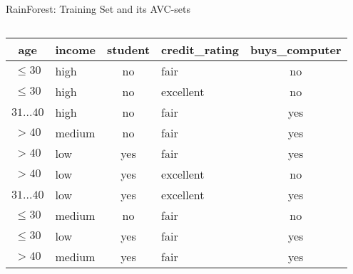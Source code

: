 \begin{frame}{RainForest: Training Set and its AVC-sets}
	\begin{columns}
		\begin{column}{0.6\textwidth}
			\begin{tabular}{|c|l|c|l|c|}
				\hline
				\cellcolor{blue!20}age            & \cellcolor{blue!20}income   & \cellcolor{blue!20}student & \cellcolor{blue!20}credit\_rating & \cellcolor{brown!20}buys\_computer \\\hline
				\cellcolor{yellow!20}$\leq30$     & \cellcolor{yellow!20}high   & \cellcolor{yellow!20}no    & \cellcolor{yellow!20}fair         & \cellcolor{red!20}no               \\\hline
				\cellcolor{yellow!20}$\leq30$     & \cellcolor{yellow!20}high   & \cellcolor{yellow!20}no    & \cellcolor{yellow!20}excellent    & \cellcolor{red!20}no               \\\hline
				\cellcolor{yellow!20}$31\ldots40$ & \cellcolor{yellow!20}high   & \cellcolor{yellow!20}no    & \cellcolor{yellow!20}fair         & \cellcolor{green!20}yes            \\\hline
				\cellcolor{yellow!20}$>40$        & \cellcolor{yellow!20}medium & \cellcolor{yellow!20}no    & \cellcolor{yellow!20}fair         & \cellcolor{green!20}yes            \\\hline
				\cellcolor{yellow!20}$>40$        & \cellcolor{yellow!20}low    & \cellcolor{yellow!20}yes   & \cellcolor{yellow!20}fair         & \cellcolor{green!20}yes            \\\hline
				\cellcolor{yellow!20}$>40$        & \cellcolor{yellow!20}low    & \cellcolor{yellow!20}yes   & \cellcolor{yellow!20}excellent    & \cellcolor{red!20}no               \\\hline
				\cellcolor{yellow!20}$31\ldots40$ & \cellcolor{yellow!20}low    & \cellcolor{yellow!20}yes   & \cellcolor{yellow!20}excellent    & \cellcolor{green!20}yes            \\\hline
				\cellcolor{yellow!20}$\leq30$     & \cellcolor{yellow!20}medium & \cellcolor{yellow!20}no    & \cellcolor{yellow!20}fair         & \cellcolor{red!20}no               \\\hline
				\cellcolor{yellow!20}$\leq30$     & \cellcolor{yellow!20}low    & \cellcolor{yellow!20}yes   & \cellcolor{yellow!20}fair         & \cellcolor{green!20}yes            \\\hline
				\cellcolor{yellow!20}$>40$        & \cellcolor{yellow!20}medium & \cellcolor{yellow!20}yes   & \cellcolor{yellow!20}fair         & \cellcolor{green!20}yes            \\\hline

\end{tabular}
\end{column}
\end{columns}
\end{frame}
